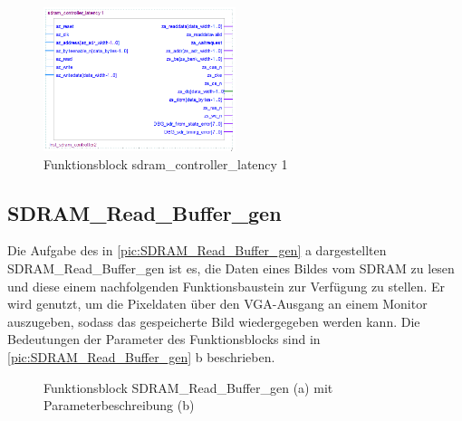 \documentclass[ngerman,12pt]{article} %
\begin{document}
{\begin{figure}[htbp]
	\begin{center}
	\includegraphics[width = 0.5\textwidth]{sdram_controller_latency_1}
	\caption [Funktionsblock sdram\_controller\_latency 1]{\label{pic:sdram_controller_latency 1}Funktionsblock sdram\_controller\_latency 1}
	\end{center}
\end{figure}



\subsection{SDRAM\_Read\_Buffer\_gen}
\label{sec:SDRAM_Read_Buffer_gen}
Die Aufgabe des in \autoref{pic:SDRAM_Read_Buffer_gen} a dargestellten SDRAM\_Read\_Buffer\_gen ist es, die Daten eines Bildes vom SDRAM zu lesen und diese einem nachfolgenden Funktionsbaustein zur Verfügung zu stellen. Er wird genutzt, um die Pixeldaten über den VGA-Ausgang an einem Monitor auszugeben, sodass das gespeicherte Bild wiedergegeben werden kann. Die Bedeutungen der Parameter des Funktionsblocks sind in \autoref{pic:SDRAM_Read_Buffer_gen} b beschrieben.\\

\begin{figure}[h!tb]
  \centering
  \qquad
  \caption[Funktionsblock SDRAM\_Read\_Buffer\_gen mit Parameterbeschreibung]{\label{pic:SDRAM_Read_Buffer_gen}Funktionsblock  SDRAM\_Read\_Buffer\_gen (a) mit Parameterbeschreibung (b)}
\end{figure}

}
\end{document}
